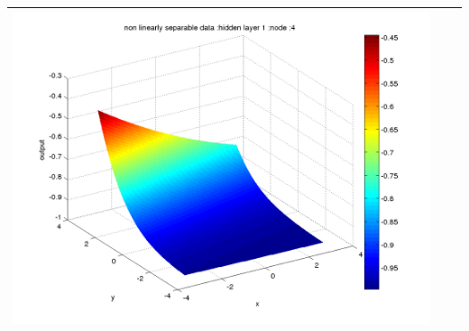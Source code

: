 \documentclass[fleqn]{article}
\begin{document}
\begin{center}
\begin{longtable}{ c | c | r }
    \includegraphics[scale=0.25]{./pics/nonlinearlyseparable/_4_2/_4_2_epoch_10_hidden layer 1 :4} &  & \\ 
    \hline
  \end{longtable}
\end{center}
\end{document}
